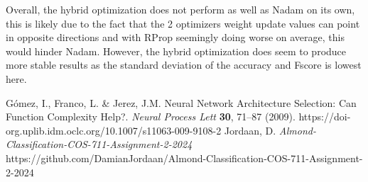 \documentclass[conference]{IEEEtran}
\begin{document}
Overall, the hybrid optimization does not perform as well as Nadam on its own, this is likely due to the fact that the 2 optimizers weight update values can point in opposite directions and with RProp seemingly doing worse on average, this would hinder Nadam. However, the hybrid optimization does seem to produce more stable results as the standard deviation of the accuracy and Fscore is lowest here. 

\newpage

\begin{thebibliography}{00}
 Gómez, I., Franco, L. \& Jerez, J.M. Neural Network Architecture Selection: Can Function Complexity Help?. \textit{Neural Process Lett} \textbf{30}, 71–87 (2009). https://doi-org.uplib.idm.oclc.org/10.1007/s11063-009-9108-2 
 Jordaan, D. \textit{Almond-Classification-COS-711-Assignment-2-2024} https://github.com/DamianJordaan/Almond-Classification-COS-711-Assignment-2-2024

\end{thebibliography}
\end{document}
